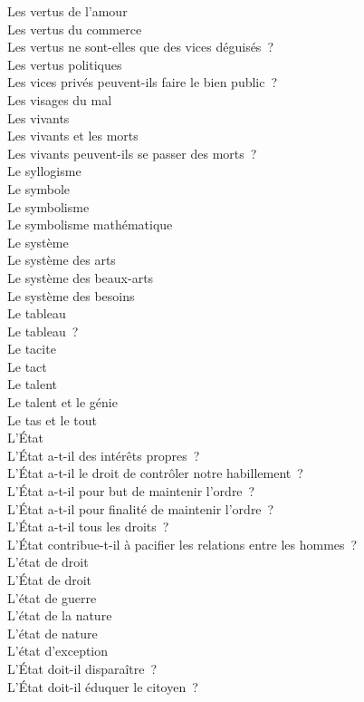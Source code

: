 \documentclass[a4paper,12pt]{article}
\begin{document}
Les vertus de l'amour \\
Les vertus du commerce \\
Les vertus ne sont-elles que des vices déguisés ? \\
Les vertus politiques \\
Les vices privés peuvent-ils faire le bien public ? \\
Les visages du mal \\
Les vivants \\
Les vivants et les morts \\
Les vivants peuvent-ils se passer des morts ? \\
Le syllogisme \\
Le symbole \\
Le symbolisme \\
Le symbolisme mathématique \\
Le système \\
Le système des arts \\
Le système des beaux-arts \\
Le système des besoins \\
Le tableau \\
Le tableau ? \\
Le tacite \\
Le tact \\
Le talent \\
Le talent et le génie \\
Le tas et le tout \\
L'État \\
L'État a-t-il des intérêts propres ? \\
L'État a-t-il le droit de contrôler notre habillement ? \\
L'État a-t-il pour but de maintenir l'ordre ? \\
L'État a-t-il pour finalité de maintenir l'ordre ? \\
L'État a-t-il tous les droits ? \\
L'État contribue-t-il à pacifier les relations entre les hommes ? \\
L'état de droit \\
L'État de droit \\
L'état de guerre \\
L'état de la nature \\
L'état de nature \\
L'état d'exception \\
L'État doit-il disparaître ? \\
L'État doit-il éduquer le citoyen ? \\
\end{document}
